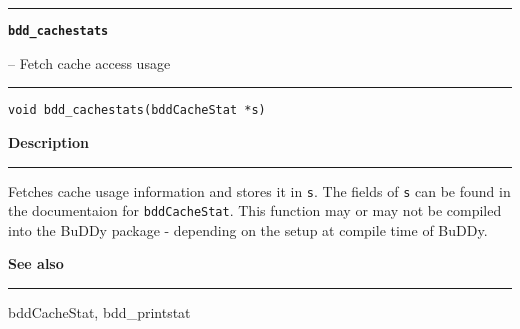 \vspace{8ex}
\begin{minipage}{\textwidth}

\noindent\begin{minipage}{\textwidth}
\rule{\textwidth}{0.5mm}
{\tt\bf bdd\_cachestats }
\--- Fetch cache access usage  \hspace{\fill}
\\\rule[1.5ex]{\textwidth}{0.5mm}
\end{minipage}

\noindent\begin{verbatim}
void bdd_cachestats(bddCacheStat *s) 
\end{verbatim}

\vspace{\parsep}\noindent
{\bf Description}\\\rule[1.5ex]{\textwidth}{0.2mm}\vspace{-1.5ex}\setlength{\parindent}{1em}
Fetches cache usage information and stores it in {\tt s}. The
           fields of {\tt s} can be found in the documentaion for
	   {\tt bddCacheStat}. This function may or may not be compiled
	   into the BuDDy package - depending on the setup at compile
	   time of BuDDy. 

\vspace{\parsep}\vspace{\baselineskip}\noindent
{\bf See also}\\\rule[1.5ex]{\textwidth}{0.2mm}\vspace{-1.5ex}
bddCacheStat, bdd\_printstat 
\end{minipage}
\vspace{8ex}
